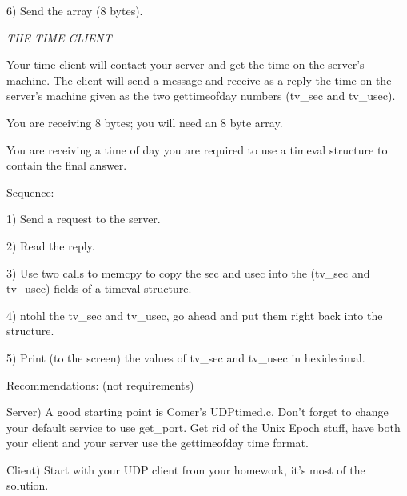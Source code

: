 6) Send the array (8 bytes).

\noindent
{\it THE TIME CLIENT}

Your time client will contact your server and get the time on the server's 
machine.
The client will send a  message and receive as a reply the
time on the server's machine given as the two {\ltt{}gettimeofday} numbers
({\ltt{}tv_sec} and {\ltt{}tv_usec}).

You are receiving 8 bytes; you will need an 8 byte array.

You are receiving a time of day you are required to
use a {\ltt{}timeval} structure to contain the final answer.

Sequence:

1) Send a request to the server.

2) Read the reply.

3) Use two calls to {\ltt{}memcpy} to copy the sec and usec into
the ({\ltt{}tv_sec} and {\ltt{}tv_usec}) fields of a {\ltt{}timeval}
structure.

4) {\ltt{}ntohl} the {\ltt{}tv_sec} and {\ltt{}tv_usec},
go ahead and put them right back into the structure.

5) Print (to the screen) the values of
{\ltt{}tv_sec} and {\ltt{}tv_usec} in hexidecimal.

\bigskip
Recommendations: (not requirements)

Server)
A good starting point is Comer's {\ltt{}UDPtimed.c}.
Don't forget to change your default {\ltt{}service} to use
{\ltt{}get_port}.
Get rid of the Unix Epoch stuff, have both your client and your server
use the {\ltt{}gettimeofday} time format.

Client) 
Start with your UDP client from your homework, it's most of the solution.
\bye
